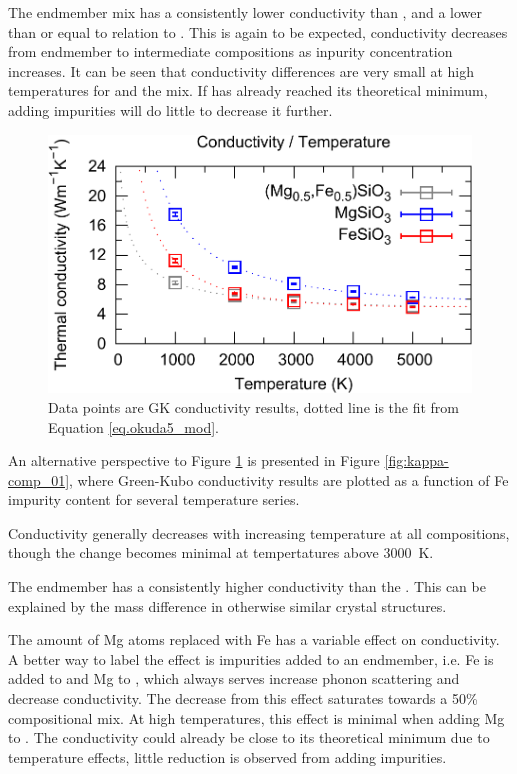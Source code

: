 The endmember mix has a consistently lower conductivity than \mgsio, and a lower than or equal to relation to \fesios. This is again to be expected, conductivity decreases from endmember to intermediate compositions as inpurity concentration increases. It can be seen that conductivity differences are very small at high temperatures for \fesios and the mix. If \fesios has already reached its theoretical minimum, adding impurities will do little to decrease it further.
%

\begin{figure}[h!]
  \includegraphics[width=\linewidth]{Figures/k-t_all_02.png}
  \caption{Data points are GK conductivity results, dotted line is the fit from Equation \ref{eq.okuda5_mod}.}
  \label{fig:kappa-temp_01}
\end{figure}

An alternative perspective to Figure \ref{fig:kappa-temp_01} is presented in Figure \ref{fig:kappa-comp_01}, where Green-Kubo conductivity results are plotted as a function of Fe impurity content for several temperature series.

Conductivity generally decreases with increasing temperature at all compositions, though the change becomes minimal at tempertatures above 3000~K.

The \mgsios endmember has a consistently higher conductivity than the \fesio. This can be explained by the mass difference in otherwise similar crystal structures.

The amount of Mg atoms replaced with Fe has a variable effect on conductivity. A better way to label the effect is impurities added to an endmember, i.e. Fe is added to \mgsios and Mg to \fesio, which always serves increase phonon scattering and decrease conductivity. The decrease from this effect saturates towards a 50\% compositional mix. At high temperatures, this effect is minimal when adding Mg to \fesio. The conductivity could already be close to its theoretical minimum due to temperature effects, little reduction is observed from adding impurities.

